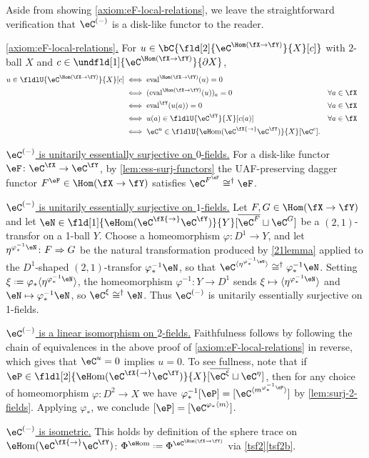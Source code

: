 \documentclass[12pt,reqno]{amsart}
\newcommand{\eFun}{{\eH}\mathrm{om}}
\newcommand{\eHom}{{\eH}\mathrm{om}}
\newcommand{\eval}{\mathrm{eval}}
\newcommand{\psn}{\Phi}
\newcommand{\C}{\eC}
\newcommand{\fcj}[1]{\overline{#1}}
\newcommand{\itemstep}[1]{\smallskip\noindent\underline{#1}}
\renewcommand{\amalg}{\sqcup}
\renewcommand{\star}{\dag}
\DeclareRobustCommand{\coloneq}{\mathrel{\vcenter{\baselineskip0.5ex\lineskiplimit0pt\hbox{\scriptsize{\upshape.}}\hbox{\scriptsize{\upshape.}}}}=}
\begin{document}
\begin{pf}
Aside from showing \ref{axiom:eF-local-relations}, we leave the straightforward verification that $\C^{(-)}$ is a disk-like functor to the reader.

\itemstep{\ref{axiom:eF-local-relations}.} For $u\in\bC\{\fld[2]{\C^{{\Hom}(\fX\to\fY)}}{X}[c]\}$ with $2$-ball $X$ and $c\in\undfld[1]{\C^{{\Hom}(\fX\to\fY)}}{\partial X}$,
\begin{align*}
u\in\fldlU{\C^{{\Hom}(\fX\to\fY)}}{X}[c]
&\iff\eval^{\Hom(\fX\to\fY)}(u)=0\\
&\iff(\eval^{\Hom(\fX\to\fY)}(u))_a=0
&\forall a\in\fX&\\
&\iff\eval^\fY(u(a))=0
&\forall a\in\fX&\\  
&\iff u(a)\in\fldlU{\C^\fY}{X}[c(a)]
&\forall a\in\fX&\\
&\iff
\C^u\in\fldlU{\eFun(\C^\fX{\to}\C^\fY)}{X}[\C^{c}].
\end{align*}

\itemstep{$\C^{(-)}$ is unitarily essentially surjective on $0$-fields.}
For a disk-like functor $\eF\colon\C^\fX\to\C^\fY$, by \cref{lem:ess-surj-functors} the UAF-preserving dagger functor $F^\eF\in\Hom(\fX\to\fY)$ satisfies $\C^{F^\eF}\cong^\star\eF$.

\itemstep{$\C^{(-)}$ is unitarily essentially surjective on $1$-fields.} 
Let $F,G\in\Hom(\fX\to\fY)$ and let $\eN\in\fld[1]{\eFun(\C^\fX{\to}\C^\fY)}{Y}[\fcj{\C^F}\amalg\C^G]$ be a $(2,1)$-transfor on a 1-ball $Y$. Choose a homeomorphism $\varphi\colon D^1\to Y$, and let $\eta^{\varphi^{-1}_*\eN}\colon F\Rightarrow G$ be the natural transformation produced by \cref{21lemma} applied to the $D^1$-shaped $(2,1)$-transfor $\varphi^{-1}_*\eN$, so that $\C^{\langle\eta^{\varphi^{-1}_*\eN}\rangle}\cong^\star\varphi^{-1}_*\eN$.
Setting $\xi\coloneq\varphi_*\langle\eta^{\varphi^{-1}_*\eN}\rangle$, the homeomorphism $\varphi^{-1}\colon Y\to D^1$ sends $\xi\mapsto\langle\eta^{\varphi^{-1}_*\eN}\rangle$ and $\eN\mapsto\varphi^{-1}_*\eN$, so $\C^\xi\cong^\star\eN$. Thus $\C^{(-)}$ is unitarily essentially surjective on 1-fields.

\itemstep{$\C^{(-)}$ is a linear isomorphism on $2$-fields.} 
Faithfulness follows by following the chain of equivalences in the above proof of \ref{axiom:eF-local-relations} in reverse, which gives that $\C^u=0$ implies $u=0$. To see fullness, note that if $\eP\in\fldl[2]{\eHom(\C^\fX{\to}\C^\fY)}{X}[\fcj{\C^\xi}\amalg\C^\eta]$, then for any choice of homeomorphism $\varphi\colon D^2\to X$ we have $\varphi^{-1}_*[\eP]=[\C^{\langle m^{\varphi^{-1}_*\eP}\rangle}]$ by \cref{lem:surj-2-fields}. Applying $\varphi_*$, we conclude $[\eP]=[\C^{\varphi_*\langle m\rangle}]$.

\itemstep{$\C^{(-)}$ is isometric.} This holds by definition of the sphere trace on $\eFun(\C^\fX{\to}\C^\fY)$: $\psn^{\eFun}\coloneq\psn^{\C^{\Hom(\fX\to\fY)}}$ via \cref{tsf2}\ref{tsf2b}.
\end{pf}
\end{document}
